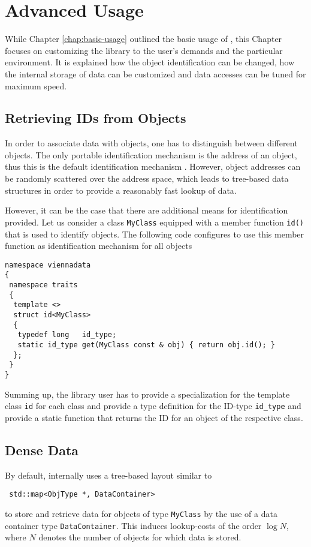 \chapter{Advanced Usage} \label{chap:advanced-usage}

While Chapter \ref{chap:basic-usage} outlined the basic usage of {\ViennaData}, this Chapter focuses
on customizing the library to the user's demands and the particular environment. It is explained how
the object identification can be changed, how the internal storage of data can be customized and data
accesses can be tuned for maximum speed.

\section{Retrieving IDs from Objects}
In order to associate data with objects, one has to distinguish between different objects. The only portable identification mechanism
is the address of an object, thus this is the default identification mechanism {\ViennaData}.
However, object addresses can be randomly scattered over the address space, which leads to tree-based data structures in order to
provide a reasonably fast lookup of data.

However, it can be the case that there are additional means for identification provided.
Let us consider a class \lstinline|MyClass| equipped with a member function \lstinline|id()| that
is used to identify objects. The following code configures {\ViennaData} to use this member function
as identification mechanism for all objects
\begin{lstlisting}
namespace viennadata
{
 namespace traits
 {
  template <>
  struct id<MyClass>
  {
   typedef long   id_type;
   static id_type get(MyClass const & obj) { return obj.id(); }
  };
 }
}
\end{lstlisting}
Summing up, the library user has to provide a specialization for the template class \lstinline|id|
for each class and provide a type definition for the ID-type \lstinline|id_type| and provide a static
function that returns the ID for an object of the respective class.

\section{Dense Data} \label{sec:dense-data}
By default, {\ViennaData} internally uses a tree-based layout similar to
\begin{lstlisting}
 std::map<ObjType *, DataContainer>
\end{lstlisting}
to store and retrieve data for objects of type \lstinline|MyClass| by the use of a data container type \lstinline|DataContainer|.
This induces lookup-costs of the order $\log N$, where $N$ denotes the number of objects for which data is stored.

